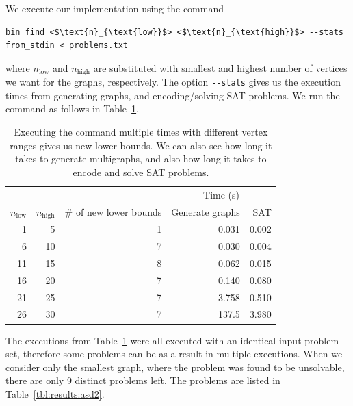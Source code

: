 We execute our implementation using the command
\begin{lstlisting}
bin find <$\text{n}_{\text{low}}$> <$\text{n}_{\text{high}}$> --stats from_stdin < problems.txt
\end{lstlisting}
where $n_\text{low}$ and $n_\text{high}$ are substituted with smallest and highest number of vertices we want for the graphs, respectively.
The option \lstinline{--stats} gives us the execution times from generating graphs, and encoding/solving SAT problems.
We run the command as follows in Table~\ref{tbl:results:asd1}.

\begin{table}[H]
    \centering
    \begin{tabular}{rrrrr}
        \toprule
        &&& \multicolumn{2}{c}{Time (s)} \\
        \cmidrule{4-5}
        $n_\text{low}$ & $n_\text{high}$ & \# of new lower bounds & Generate graphs & SAT\\
        \midrule
        1  & 5  & 1 & 0.031 & 0.002\\
        6  & 10 & 7 & 0.030 & 0.004\\
        11 & 15 & 8 & 0.062 & 0.015\\
        16 & 20 & 7 & 0.140 & 0.080\\
        21 & 25 & 7 & 3.758 & 0.510\\
        26 & 30 & 7 & 137.5\phantom{00} & 3.980\\
        \bottomrule
    \end{tabular}
    \caption{%
    Executing the command multiple times with different vertex ranges gives us new lower bounds.
    We can also see how long it takes to generate multigraphs, and also how long it takes to encode and solve SAT problems.
    }
    \label{tbl:results:asd1}
\end{table}

The executions from Table~\ref{tbl:results:asd1} were all executed with an identical input problem set, therefore some problems can be as a result in multiple executions.
When we consider only the smallest graph, where the problem was found to be unsolvable, there are only 9 distinct problems left.
The problems are listed in Table~\ref{tbl:results:asd2}.

